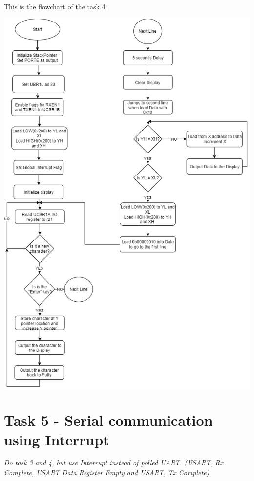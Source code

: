 \documentclass[a4paper,12pt]{article}
\begin{document}
This is the flowchart of the task 4:
\begin{center}
\includegraphics[scale=0.7]{img/Task4.png}
\end{center}
\newpage
\section{Task 5 - Serial communication using Interrupt}
\textit{Do task 3 and 4, but use Interrupt instead of polled UART.
(USART, Rx Complete, USART Data Register Empty and
USART, Tx Complete)}
\end{document}
